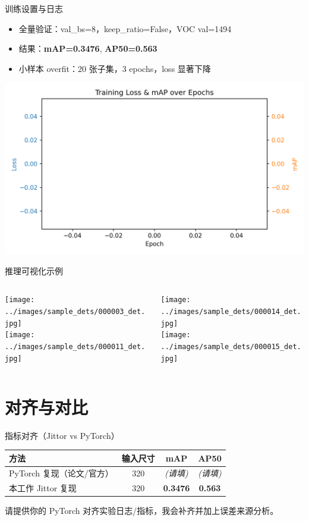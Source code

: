 \documentclass{beamer}
\begin{document}
\begin{frame}{训练设置与日志}
  \begin{itemize}
    \item 全量验证：val\_bs=8，keep\_ratio=False，VOC val=1494
    \item 结果：\textbf{mAP=0.3476}, \textbf{AP50=0.563}
    \item 小样本 overfit：20 张子集，3 epochs，loss 显著下降
  \end{itemize}
  \begin{center}
    \includegraphics[width=0.65\linewidth]{../images/curves.png}
  \end{center}
\end{frame}

\begin{frame}{推理可视化示例}
  \begin{columns}
    \begin{column}{0.5\textwidth}
      \texttt{[image: ../images/sample\_dets/000003\_det.jpg]}\\[2mm]
      \texttt{[image: ../images/sample\_dets/000011\_det.jpg]}
    \end{column}
    \begin{column}{0.5\textwidth}
      \texttt{[image: ../images/sample\_dets/000014\_det.jpg]}\\[2mm]
      \texttt{[image: ../images/sample\_dets/000015\_det.jpg]}
    \end{column}
  \end{columns}
\end{frame}

\section{对齐与对比}

\begin{frame}{指标对齐（Jittor vs PyTorch）}
  \begin{table}[h]
    \centering
    \begin{tabular}{lccc}
      \toprule
      方法 & 输入尺寸 & mAP & AP50 \\
      \midrule
      PyTorch 复现（论文/官方） & 320 & \textit{(请填)} & \textit{(请填)} \\
      本工作 Jittor 复现 & 320 & \textbf{0.3476} & \textbf{0.563} \\
      \bottomrule
    \end{tabular}
  \end{table}
  \vspace{0.2cm}
  \textcolor{myred}{请提供你的 PyTorch 对齐实验日志/指标，我会补齐并加上误差来源分析。}
\end{frame}
\end{document}
